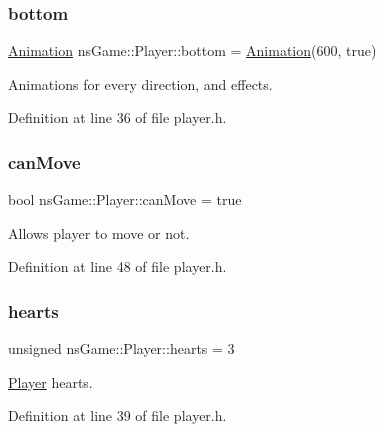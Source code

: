 \subsubsection{\texorpdfstring{bottom}{bottom}}
{\footnotesize\ttfamily \hyperlink{classns_game_1_1_animation}{Animation} ns\+Game\+::\+Player\+::bottom = \hyperlink{classns_game_1_1_animation}{Animation}(600, true)}



Animations for every direction, and effects. 



Definition at line 36 of file player.\+h.

\mbox{\label{classns_game_1_1_player_a18028809a0ff7dc90f14a154834d2533}} 
\subsubsection{\texorpdfstring{can\+Move}{canMove}}
{\footnotesize\ttfamily bool ns\+Game\+::\+Player\+::can\+Move = true}



Allows player to move or not. 



Definition at line 48 of file player.\+h.

\mbox{\label{classns_game_1_1_player_ae01e31235ac9210a5bb71c1db166ebe6}} 
\subsubsection{\texorpdfstring{hearts}{hearts}}
{\footnotesize\ttfamily unsigned ns\+Game\+::\+Player\+::hearts = 3}



\hyperlink{classns_game_1_1_player}{Player} hearts. 



Definition at line 39 of file player.\+h.

\mbox{\label{classns_game_1_1_player_ae2def499a090256dbcc508d9b660cdce}} 
